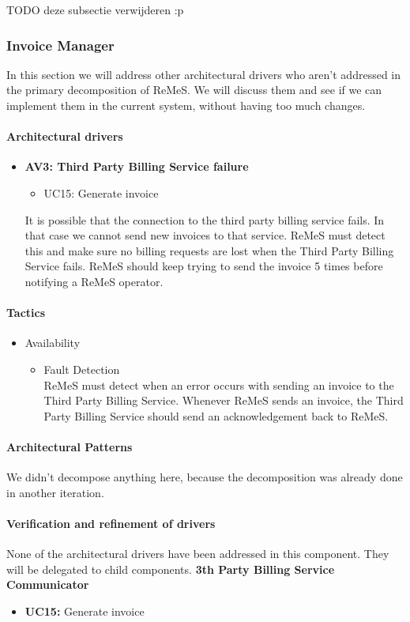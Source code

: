 TODO deze subsectie verwijderen :p
\subsubsection{Invoice Manager}
In this section we will address other architectural drivers who aren't addressed
	in the primary decomposition of ReMeS. We will discuss them and see if we can
	implement them in the current system, without having too much changes.
\paragraph{Architectural drivers}

\begin{itemize}
	\item \textbf{AV3: Third Party Billing Service failure}
	\begin{itemize}
		\item UC15: Generate invoice
	\end{itemize}
	It is possible that the connection to the third party billing service fails.
	In that case we cannot send new invoices to that service. ReMeS must detect
		this and make sure no billing requests are lost when the Third Party
		Billing Service fails. ReMeS should keep trying to send the invoice 5 times
		before notifying a ReMeS operator.
\end{itemize}


\paragraph{Tactics}
\begin{itemize}
	\item Availability
	\begin{itemize}
		\item Fault Detection\\
		ReMeS must detect when an error occurs with sending an invoice to the Third
			Party Billing Service. Whenever ReMeS sends an invoice, the Third Party
			Billing Service should send an acknowledgement back to ReMeS.
	\end{itemize}
\end{itemize}


\paragraph{Architectural Patterns}
We didn't decompose anything here, because the decomposition was already
	done in another iteration.


\paragraph{Verification and refinement of drivers}
None of the architectural drivers have been addressed in this component.
They will be delegated to child components.
\textbf{3th Party Billing Service Communicator}
\begin{itemize}
	\item \textbf{UC15: } Generate invoice
\end{itemize}
